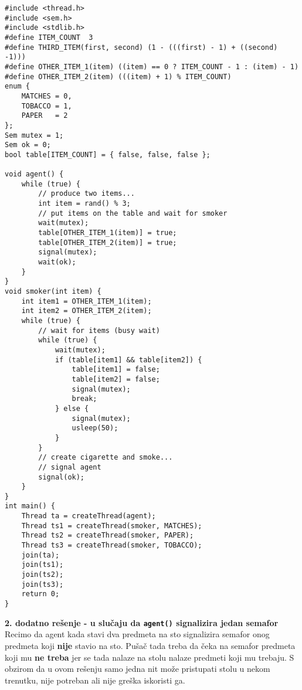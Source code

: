 \begin{lstlisting}
#include <thread.h>
#include <sem.h>
#include <stdlib.h>
#define ITEM_COUNT  3
#define THIRD_ITEM(first, second) (1 - (((first) - 1) + ((second) -1)))
#define OTHER_ITEM_1(item) ((item) == 0 ? ITEM_COUNT - 1 : (item) - 1)
#define OTHER_ITEM_2(item) (((item) + 1) % ITEM_COUNT) 
enum {
    MATCHES = 0,
    TOBACCO = 1,
    PAPER   = 2
};
Sem mutex = 1;
Sem ok = 0;
bool table[ITEM_COUNT] = { false, false, false };

void agent() {
    while (true) {
        // produce two items...
        int item = rand() % 3;
        // put items on the table and wait for smoker
        wait(mutex);
        table[OTHER_ITEM_1(item)] = true;
        table[OTHER_ITEM_2(item)] = true;
        signal(mutex);
        wait(ok);
    }
}
void smoker(int item) {
    int item1 = OTHER_ITEM_1(item);
    int item2 = OTHER_ITEM_2(item);
    while (true) {
        // wait for items (busy wait)
        while (true) {
            wait(mutex);
            if (table[item1] && table[item2]) {
                table[item1] = false;
                table[item2] = false;
                signal(mutex);
                break;
            } else {
                signal(mutex);
                usleep(50);
            }
        }
		// create cigarette and smoke...
		// signal agent
        signal(ok);
    }
}
int main() {
    Thread ta = createThread(agent);
    Thread ts1 = createThread(smoker, MATCHES);
    Thread ts2 = createThread(smoker, PAPER);
    Thread ts3 = createThread(smoker, TOBACCO);
    join(ta);
    join(ts1);
    join(ts2);
    join(ts3);
    return 0;
}

\end{lstlisting}
\clearpage
\textbf{\large 2. dodatno re\v{s}enje - u slu\v{c}aju da \texttt{agent()} signalizira jedan semafor}\\
Recimo da agent kada stavi dva predmeta na sto signalizira semafor onog predmeta koji \textbf{nije} stavio na sto. Pu\v{s}a\v{c} tada treba da \v{c}eka na semafor predmeta koji mu \textbf{ne treba} jer se tada nalaze na stolu nalaze predmeti koji mu  trebaju. S obzirom da u ovom re\v{s}enju samo jedna nit mo\v{z}e pristupati stolu u nekom trenutku,  nije potreban ali nije gre\v{s}ka iskoristi ga.
